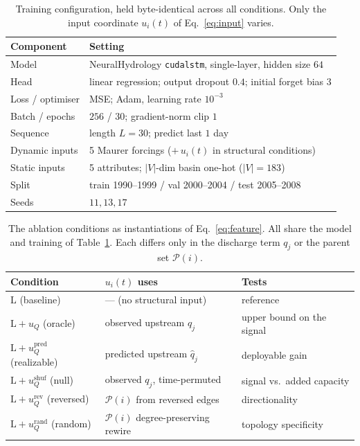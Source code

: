 \documentclass[11pt]{article}
\begin{document}
\begin{table}[t]
\centering
\caption{Training configuration, held byte-identical across all conditions. Only the input
coordinate $u_i(t)$ of Eq.~\eqref{eq:input} varies.}
\label{tab:config}
\begin{tabular}{ll}
\toprule
Component & Setting \\
\midrule
Model & NeuralHydrology \texttt{cudalstm}, single-layer, hidden size $64$ \\
Head & linear regression; output dropout $0.4$; initial forget bias $3$ \\
Loss / optimiser & MSE; Adam, learning rate $10^{-3}$ \\
Batch / epochs & $256$ / $30$; gradient-norm clip $1$ \\
Sequence & length $L=30$; predict last $1$ day \\
Dynamic inputs & 5 Maurer forcings ($+\,u_i(t)$ in structural conditions) \\
Static inputs & 5 attributes; $|V|$-dim basin one-hot ($|V|=183$) \\
Split & train 1990--1999 / val 2000--2004 / test 2005--2008 \\
Seeds & $11,13,17$ \\
\bottomrule
\end{tabular}
\end{table}

\begin{table}[t]
\centering
\caption{The ablation conditions as instantiations of Eq.~\eqref{eq:feature}. All share the model
and training of Table~\ref{tab:config}. Each differs only in the discharge term $q_j$ or the parent
set $\mathcal{P}(i)$.}
\label{tab:conditions}
\begin{tabularx}{\linewidth}{llX}
\toprule
Condition & $u_i(t)$ uses & Tests \\
\midrule
$\mathrm{L}$ (baseline) & --- (no structural input) & reference \\
$\mathrm{L}{+}u_Q$ (oracle) & observed upstream $q_j$ & upper bound on the signal \\
$\mathrm{L}{+}u_Q^{\mathrm{pred}}$ (realizable) & predicted upstream $\hat{q}_j$ & deployable gain \\
$\mathrm{L}{+}u_Q^{\mathrm{shuf}}$ (null) & observed $q_j$, time-permuted & signal vs.\ added capacity \\
$\mathrm{L}{+}u_Q^{\mathrm{rev}}$ (reversed) & $\mathcal{P}(i)$ from reversed edges & directionality \\
$\mathrm{L}{+}u_Q^{\mathrm{rand}}$ (random) & $\mathcal{P}(i)$ degree-preserving rewire & topology specificity \\
\bottomrule
\end{tabularx}
\end{table}
\end{document}
